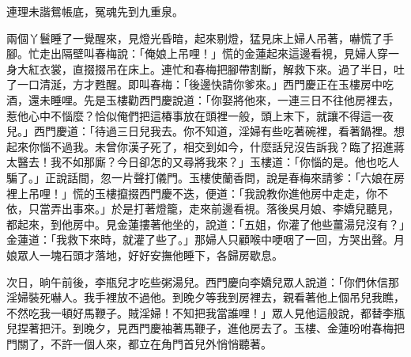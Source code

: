 連理未諧鴛帳底，冤魂先到九重泉。

兩個丫鬟睡了一覺醒來，見燈光昏暗，起來剔燈，猛見床上婦人吊著，嚇慌了手腳。忙走出隔壁叫春梅說：「俺娘上吊哩！」慌的金蓮起來這邊看視，見婦人穿一身大紅衣裳，直掇掇吊在床上。連忙和春梅把腳帶割斷，解救下來。過了半日，吐了一口清涎，方才甦醒。即叫春梅：「後邊快請你爹來。」西門慶正在玉樓房中吃酒，還未睡哩。先是玉樓勸西門慶說道：「你娶將他來，一連三日不往他房裡去，惹他心中不惱麼？恰似俺們把這椿事放在頭裡一般，頭上末下，就讓不得這一夜兒。」西門慶道：「待過三日兒我去。你不知道，淫婦有些吃著碗裡，看著鍋裡。想起來你惱不過我。未曾你漢子死了，相交到如今，什麼話兒沒告訴我？臨了招進蔣太醫去！我不如那廝？今日卻怎的又尋將我來？」玉樓道：「你惱的是。他也吃人騙了。」正說話間，忽一片聲打儀門。玉樓使蘭香問，說是春梅來請爹：「六娘在房裡上吊哩！」慌的玉樓攛掇西門慶不迭，便道：「我說教你進他房中走走，你不依，只當弄出事來。」於是打著燈籠，走來前邊看視。落後吳月娘、李嬌兒聽見，都起來，到他房中。見金蓮摟著他坐的，說道：「五姐，你灌了他些薑湯兒沒有？」金蓮道：「我救下來時，就灌了些了。」那婦人只顧喉中哽咽了一回，方哭出聲。月娘眾人一塊石頭才落地，好好安撫他睡下，各歸房歇息。

次日，晌午前後，李瓶兒才吃些粥湯兒。西門慶向李嬌兒眾人說道：「你們休信那淫婦裝死嚇人。我手裡放不過他。到晚夕等我到房裡去，親看著他上個吊兒我瞧，不然吃我一頓好馬鞭子。賊淫婦！不知把我當誰哩！」眾人見他這般說，都替李瓶兒捏著把汗。到晚夕，見西門慶袖著馬鞭子，進他房去了。玉樓、金蓮吩咐春梅把門關了，不許一個人來，都立在角門首兒外悄悄聽著。

